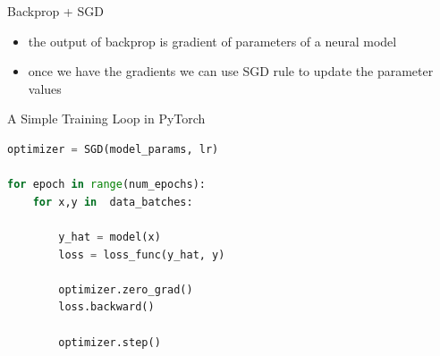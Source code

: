 \begin{frame}{Backprop + SGD}
\begin{itemize}
    \item<1-> the output of backprop is gradient of parameters of a neural model
    \item<2-> once we have the gradients we can use SGD rule to update the parameter values
\end{itemize}
\end{frame}
\begin{frame}[fragile]{A Simple Training Loop in PyTorch}
\begin{lstlisting}[language=Python]
optimizer = SGD(model_params, lr)

for epoch in range(num_epochs):
    for x,y in  data_batches:
        
        y_hat = model(x) 
        loss = loss_func(y_hat, y)
        
        optimizer.zero_grad() 
        loss.backward()
        
        optimizer.step()
\end{lstlisting}
\end{frame}


        
